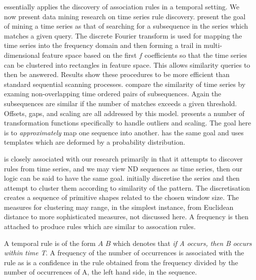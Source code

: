 \medskip

\cite{sa96} essentially applies the discovery of association rules in a
temporal setting. We now present data mining research on time series
rule discovery. \cite{frm94} present the goal of mining a time series as
that of searching for a subsequence in the series which matches a
given query. The discrete Fourier transform is used for
mapping the time series into the frequency domain and then forming a
trail in multi-dimensional feature space based on the first $f$
coefficients so that the time series can be clustered into rectangles
in feature space. This allows similarity queries to then be answered. 
Results show these
procedures to be more efficient than standard sequential scanning
processes. \cite{alss95,dgm97,rm97} compare the similarity of time
series by examing non-overlapping time ordered pairs of
subsequences. Again the subsequences are similar if the number of
matches exceeds a given threshold. Offsets, gaps, and scaling are all
addressed by this model. \cite{dgm97} presents a number of
transformation functions specifically to handle outliers and
scaling. The goal here is to {\em approximately} map one sequence into
another. \cite{ks97} has the same goal and uses templates which are
deformed by a probability distribution.

\medskip

\cite{dlm98} is closely associated with our research primarily in that
it attempts to discover rules from time series, and we may view ND
sequences as time series, then our logic can be said to have the same
goal. \cite{dlm98} initially discretise the series and then attempt to
cluster them according to similarity of the pattern. The
discretisation creates a sequence of primitive shapes related to the
chosen window size. The measures for clustering may range, in the
simplest instance, from Euclidean distance to more sophisticated
measures, not discussed here. A frequency is then attached to produce
rules which are similar to assocation rules.


\begin{definition}
\begin{rm}
A temporal rule is of the form $A$
 $B$
which denotes that {\em if A occurs, then B occurs within time T}. A
frequency of the number of occurrences is associated with the rule as
is a confidence in the rule obtained from the frequency divided by the
number of occurrences of A, the left hand side, in the sequence.
\end{rm}
\end{definition}

